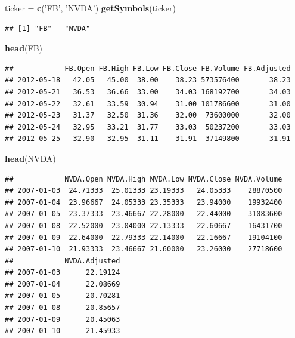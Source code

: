 \documentclass[]{book}
\newenvironment{Shaded}{\begin{snugshade}}{\end{snugshade}}
\newcommand{\KeywordTok}[1]{\textcolor[rgb]{0.13,0.29,0.53}{\textbf{#1}}}
\newcommand{\NormalTok}[1]{#1}
\newcommand{\StringTok}[1]{\textcolor[rgb]{0.31,0.60,0.02}{#1}}
\begin{document}
\begin{Shaded}
\begin{Highlighting}[]
\NormalTok{ticker =}\StringTok{ }\KeywordTok{c}\NormalTok{(}\StringTok{'FB'}\NormalTok{, }\StringTok{'NVDA'}\NormalTok{) }
\KeywordTok{getSymbols}\NormalTok{(ticker)}
\end{Highlighting}
\end{Shaded}

\begin{verbatim}
## [1] "FB"   "NVDA"
\end{verbatim}

\begin{Shaded}
\begin{Highlighting}[]
\KeywordTok{head}\NormalTok{(FB)}
\end{Highlighting}
\end{Shaded}

\begin{verbatim}
##            FB.Open FB.High FB.Low FB.Close FB.Volume FB.Adjusted
## 2012-05-18   42.05   45.00  38.00    38.23 573576400       38.23
## 2012-05-21   36.53   36.66  33.00    34.03 168192700       34.03
## 2012-05-22   32.61   33.59  30.94    31.00 101786600       31.00
## 2012-05-23   31.37   32.50  31.36    32.00  73600000       32.00
## 2012-05-24   32.95   33.21  31.77    33.03  50237200       33.03
## 2012-05-25   32.90   32.95  31.11    31.91  37149800       31.91
\end{verbatim}

\begin{Shaded}
\begin{Highlighting}[]
\KeywordTok{head}\NormalTok{(NVDA)}
\end{Highlighting}
\end{Shaded}

\begin{verbatim}
##            NVDA.Open NVDA.High NVDA.Low NVDA.Close NVDA.Volume
## 2007-01-03  24.71333  25.01333 23.19333   24.05333    28870500
## 2007-01-04  23.96667  24.05333 23.35333   23.94000    19932400
## 2007-01-05  23.37333  23.46667 22.28000   22.44000    31083600
## 2007-01-08  22.52000  23.04000 22.13333   22.60667    16431700
## 2007-01-09  22.64000  22.79333 22.14000   22.16667    19104100
## 2007-01-10  21.93333  23.46667 21.60000   23.26000    27718600
##            NVDA.Adjusted
## 2007-01-03      22.19124
## 2007-01-04      22.08669
## 2007-01-05      20.70281
## 2007-01-08      20.85657
## 2007-01-09      20.45063
## 2007-01-10      21.45933
\end{verbatim}
\end{document}
